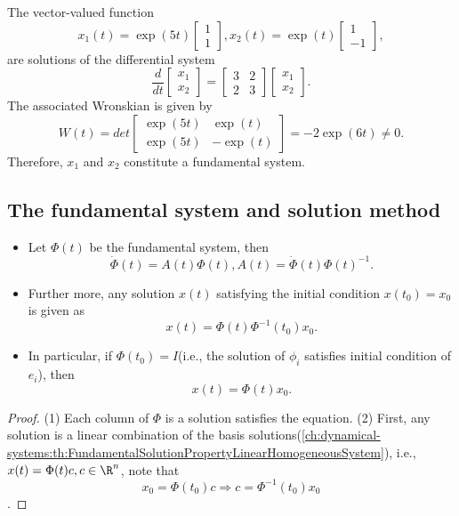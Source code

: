 \begin{refsection}
\begin{example}
The vector-valued function
$$x_1(t) = \exp(5t)\begin{bmatrix}
1\\
1
\end{bmatrix},x_2(t) = \exp(t)\begin{bmatrix}
1\\
-1
\end{bmatrix},$$
are solutions of the differential system
$$\frac{d}{dt}\begin{bmatrix}
x_1\\
x_2
\end{bmatrix} = \begin{bmatrix}
3 & 2\\
2 & 3
\end{bmatrix}\begin{bmatrix}
x_1\\
x_2
\end{bmatrix}.$$
The associated Wronskian is given by
$$W(t)=det\begin{bmatrix}
\exp(5t) & \exp(t) \\
\exp(5t) & -\exp(t) 
\end{bmatrix} = -2\exp(6t) \neq 0.$$	
Therefore, $x_1$ and $x_2$ constitute a fundamental system.
\end{example}



\subsection{The fundamental system and solution method}

\begin{theorem}\label{ch:dynamical-systems:th:propertyoffundamentalmatrixLinearHomogeneousSystem}\hfill
	\begin{itemize}
		\item Let $\Phi(t)$ be the fundamental system, then $$\dot{\Phi}(t) = A(t)\Phi(t), A(t) = \dot{\Phi}(t)\Phi(t)^{-1}.$$
		\item Further more, any solution $x(t)$ satisfying the initial condition $x(t_0)=x_0$ is given as
		$$x(t) = \Phi(t)\Phi^{-1}(t_0)x_0.$$
		\item In particular, if $\Phi(t_0)=I$(i.e., the solution of $\phi_i$ satisfies initial condition of $e_i$), then
		$$x(t) = \Phi(t)x_0.$$
	\end{itemize}	
\end{theorem}
\begin{proof}
	(1) Each column of $\Phi$ is a solution satisfies the equation. (2) First, any solution is a linear combination of the basis solutions(\autoref{ch:dynamical-systems:th:FundamentalSolutionPropertyLinearHomogeneousSystem}), i.e., $x(t) = \Phi(t)c,c\in \R^n$, note that $$x_0 = \Phi(t_0)c\Rightarrow c = \Phi^{-1}(t_0)x_0$$.
\end{proof}


\end{refsection}

